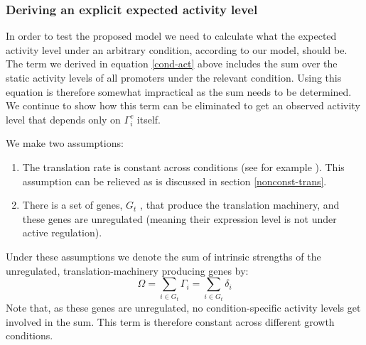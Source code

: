 \documentclass[a4page,notitlepage]{article}
\begin{document}
\subsubsection{Deriving an explicit expected activity level}
In order to test the proposed model we need to calculate what the expected activity level under an arbitrary condition, according to our model, should be.
The term we derived in equation \ref{cond-act} above includes the sum over the static activity levels of all promoters under the relevant condition.
Using this equation is therefore somewhat impractical as the sum needs to be determined.
We continue to show how this term can be eliminated to get an observed activity level that depends only on $\Gamma^c_i$ itself.

We make two assumptions:
\begin{enumerate}
\item The translation rate is constant across conditions (see for example \cite{Neidhardt1999a}).
This assumption can be relieved as is discussed in section \ref{nonconst-trans}.
\item There is a set of genes, $G_t$ , that produce the translation machinery, and these genes are unregulated (meaning their expression level is not under active regulation).
\end{enumerate}
Under these assumptions we denote the sum of intrinsic strengths of the unregulated, translation-machinery producing genes by:
\[\Omega=\sum_{i \in G_t}\Gamma_i=\sum_{i \in G_t}\delta_i\]
Note that, as these genes are unregulated, no condition-specific activity levels get involved in the sum.
This term is therefore constant across different growth conditions.
\end{document}
